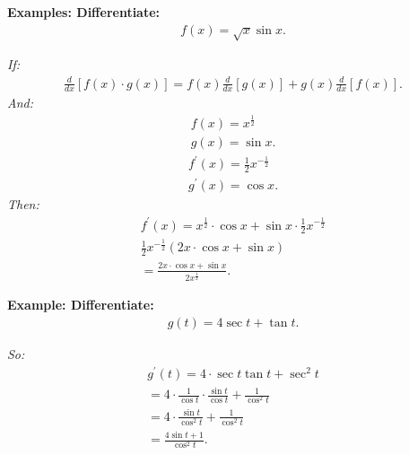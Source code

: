 \documentclass{report}
\begin{document}
  \bigbreak \noindent 
  \begin{mdframed}
    \textbf{Examples: Differentiate:}
    \begin{align*}
      f(x) = \sqrt{x} \sin{x}
    .\end{align*}
  \end{mdframed}
  \bigbreak \noindent 
  \textit{If:}
  \begin{align*}
    \frac{d}{dx}[f(x) \cdot g(x)] = f(x) \frac{d}{dx}[g(x)] + g(x) \frac{d}{dx}[f(x)]
  .\end{align*}
  \bigbreak \noindent 
  \textit{And:}
  \begin{align*}
    f(x) = x^{ \frac{1}{2}} \\ 
    g(x) = \sin{x}
  .\end{align*}
  \begin{align*}
    f ^{\prime}(x) = \frac{1}{2}x^{-\frac{1}{2}} \\
    g ^{\prime}(x) = \cos{x}
  .\end{align*}
  \bigbreak \noindent 
  \textit{Then:}
  \begin{align*}
    f ^{\prime}(x) = x^{ \frac{1}{2}} \cdot \cos{x} + \sin{x} \cdot \frac{1}{2}x^{ - \frac{1}{2}} \\ 
    \frac{1}{2}x^{- \frac{1}{2}}(2x \cdot \cos{x} + \sin{x}) \\
    = \frac{2x \cdot \cos{x} + \sin{x}}{2x^{ \frac{1}{2}}}
  .\end{align*}

  \bigbreak \noindent 
  \begin{mdframed}
    \textbf{Example: Differentiate:}
    \begin{align*}
      g(t) = 4 \sec{t} + \tan{t} 
    .\end{align*}
  \end{mdframed}
  \bigbreak \noindent 
  \textit{So:}
  \begin{align*}
    g ^{\prime}(t) = 4 \cdot \sec{t} \tan{t} + \sec^2{t} \\
    = 4 \cdot \frac{1}{ \cos{t}} \cdot \frac{ \sin{t}}{ \cos{t}} + \frac{1}{ \cos^2{t}} \\
    = 4 \cdot \frac{ \sin{t}}{\cos^2{t}} + \frac{1}{ \cos^2{t}} \\
    = \frac{4 \sin{t}+1}{ \cos^2{t}}
  .\end{align*}
\end{document}
